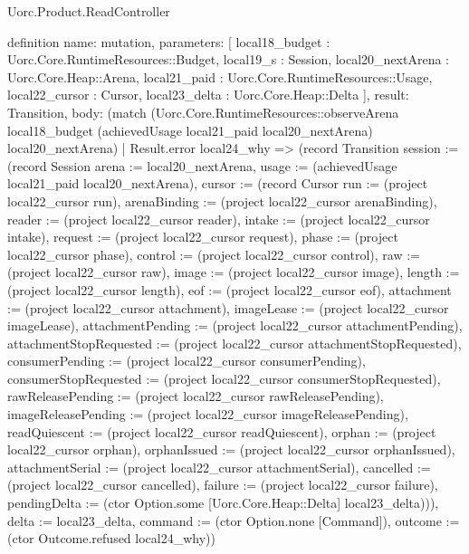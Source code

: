 \begin{lexlean}{Uorc.Product.ReadController}
\begin{semanticmodule}
definition{
  name: mutation,
  parameters: [
    local18_budget : Uorc.Core.RuntimeResources::Budget,
    local19_s : Session,
    local20_nextArena : Uorc.Core.Heap::Arena,
    local21_paid : Uorc.Core.RuntimeResources::Usage,
    local22_cursor : Cursor,
    local23_delta : Uorc.Core.Heap::Delta
  ],
  result: Transition,
  body: (match (Uorc.Core.RuntimeResources::observeArena local18_budget (achievedUsage local21_paid local20_nextArena) local20_nextArena)
    | Result.error local24_why => (record Transition {session := (record Session {arena := local20_nextArena, usage := (achievedUsage local21_paid local20_nextArena), cursor := (record Cursor {run := (project local22_cursor run), arenaBinding := (project local22_cursor arenaBinding), reader := (project local22_cursor reader), intake := (project local22_cursor intake), request := (project local22_cursor request), phase := (project local22_cursor phase), control := (project local22_cursor control), raw := (project local22_cursor raw), image := (project local22_cursor image), length := (project local22_cursor length), eof := (project local22_cursor eof), attachment := (project local22_cursor attachment), imageLease := (project local22_cursor imageLease), attachmentPending := (project local22_cursor attachmentPending), attachmentStopRequested := (project local22_cursor attachmentStopRequested), consumerPending := (project local22_cursor consumerPending), consumerStopRequested := (project local22_cursor consumerStopRequested), rawReleasePending := (project local22_cursor rawReleasePending), imageReleasePending := (project local22_cursor imageReleasePending), readQuiescent := (project local22_cursor readQuiescent), orphan := (project local22_cursor orphan), orphanIssued := (project local22_cursor orphanIssued), attachmentSerial := (project local22_cursor attachmentSerial), cancelled := (project local22_cursor cancelled), failure := (project local22_cursor failure), pendingDelta := (ctor Option.some [Uorc.Core.Heap::Delta] local23_delta)})}), delta := local23_delta, command := (ctor Option.none [Command]), outcome := (ctor Outcome.refused local24_why)})
}
\end{semanticmodule}
\end{lexlean}
